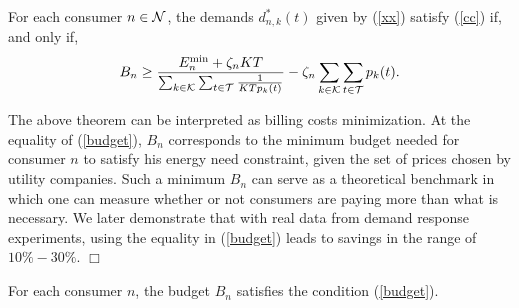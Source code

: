 \begin{theorem}
For each consumer $n \in {\cal N}$, the demands $d^*_{n,k}(t)$ given by (\ref{xx}) satisfy (\ref{cc}) if, and only if, 
\begin{equation} B_n \geq \frac{E_n^{{\rm min}}+\zeta_nKT}{\sum_{k\in {\cal K}}\sum_{t\in {\cal T}}\frac{1}{KTp_k(t)}}-\zeta_n \sum_{k\in {\cal K}}\sum_{t\in {\cal T}}p_k(t). \label{budget} \end{equation}
\end{theorem}

{\color{black}
\begin{remark} The above theorem can be interpreted as billing costs minimization. At the equality of (\ref{budget}), $B_n$ corresponds to the minimum budget needed for consumer $n$ to satisfy his energy need constraint, given the set of prices chosen by utility companies. Such a minimum $B_n$ can serve as a theoretical benchmark in which one can measure whether or not consumers are paying more than what is necessary.  We later demonstrate that with real data from demand response experiments, using the equality in (\ref{budget}) leads to savings in the range of $10\%-30\%$. \hfill $\Box$
\end{remark}


\begin{assumption}
For each consumer $n$, the budget $B_n$ satisfies the condition (\ref{budget}).
\label{assumption1}
\end{assumption}
}
